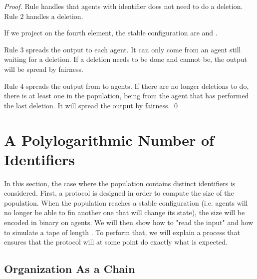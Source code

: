 \documentclass[UKenglish]{llncs}
\begin{document}
\begin{proof}
Rule  handles that agents with identifier  does not need to do a deletion.
Rule 2 handles a deletion.

If we project on the fourth element, the stable configuration are
 and .

Rule 3 spreads the output  to each agent. It can only come
from an agent still waiting for a deletion. If a deletion needs to be done
and cannot be, the output  will be spread by fairness.

Rule 4 spreads the output  from  to  agents.
If there are no longer deletions to do, there is at least one  in the population,
being from the agent that has performed the last deletion.
It will spread the output  by fairness. \hfill \qed
\end{proof}







 




\section{A Polylogarithmic Number of Identifiers}\label{sec:3p}

In this section, the case where the population  contains   distinct
identifiers is considered. First, a protocol is designed in order to compute   the size of the population. 
When the population reaches a stable configuration (i.e. agents will no longer be able
to fin another one that will change its state), the size 
will be encoded in binary  on  agents. We will then show how to 
"read the input" and how to simulate a tape of length . To perform that,
we will explain a process that ensures that the protocol will at some point
do exactly what is expected.

\subsection{Organization As a Chain}
\end{document}
